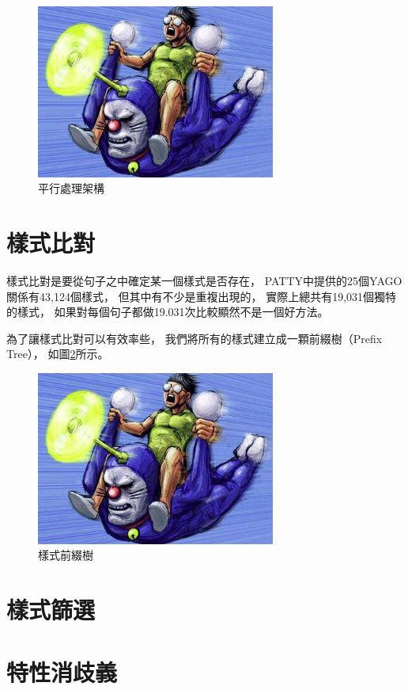 \begin{figure}
    \centering
    \includegraphics[width=0.7\textwidth]{images/00-tmp-img}    %
    \caption{平行處理架構}
    \label{i:process-parallel}
\end{figure}

\section{樣式比對}
\label{s:pattern-match}

樣式比對是要從句子之中確定某一個樣式是否存在，
PATTY中提供的25個YAGO關係有43,124個樣式，
但其中有不少是重複出現的，
實際上總共有19,031個獨特的樣式，
如果對每個句子都做19.031次比較顯然不是一個好方法。

為了讓樣式比對可以有效率些，
我們將所有的樣式建立成一顆前綴樹（Prefix Tree），
如圖\ref{i:pattern-prefix-tree}所示。

\begin{figure}
    \centering
    \includegraphics[width=0.7\textwidth]{images/00-tmp-img}    %
    \caption{樣式前綴樹}
    \label{i:pattern-prefix-tree}
\end{figure}





\section{樣式篩選}
\label{s:select-pattern}

\section{特性消歧義}
\label{s:pattern-disambiguity}



